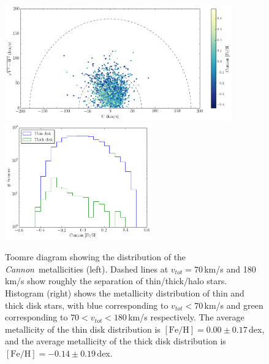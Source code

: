 \documentclass[twocolumn]{aastex62}
\newcommand{\cannon}{\textsl{Cannon}}
\newcommand{\feh}{[{\mathrm{Fe}/\mathrm{H}}]}
\begin{document}
\begin{figure}
\begin{center}
	\includegraphics[height=5cm]{figures/toomre.png}
	\includegraphics[height=5cm]{figures/met_hist.png}
	\caption{Toomre diagram showing the distribution of the \cannon\ metallicities (left). Dashed lines at $v_{tot}=70$\,km/s and 180\,km/s show roughly the separation of thin/thick/halo stars. Histogram (right) shows the metallicity distribution of thin and thick disk stars, with blue corresponding to $v_{tot}<70$\,km/s and green corresponding to $70<v_{tot}<180$\,km/s respectively. The average metallicity of the thin disk distribution is $\feh=0.00\pm0.17\,$dex, and the average metallicity of the thick disk distribution is $\feh=-0.14\pm0.19\,$dex.}
	\label{fig:toomre}
\end{center}
\end{figure}
\end{document}
